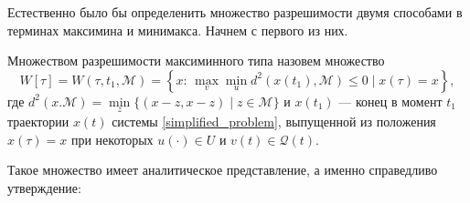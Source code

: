 Естественно было бы определенить множество разрешимости двумя способами в терминах
 максимина и минимакса. Начнем с первого из них.

 \begin{definition}
    Множеством разрешимости максиминного типа назовем множество
    \begin{equation*}
        W[\tau] = W(\tau, t_1, \mathcal{M}) = \left\{ x: \, \max_v \min_u
         d^2(x(t_1), \mathcal{M}) \le 0 \mid x(\tau) = x \right\}, 
    \end{equation*}
     где \( d^2(x. \mathcal{M}) = \min\limits_z \{ (x-z,x-z) \mid z \in 
     \mathcal{M} \} \) и \( x(t_1) \) --- конец в момент \( t_1 \) траектории
     \( x(t) \) системы \eqref{simplified_problem}, выпущенной из положения 
     \( x(\tau) = x \) при некоторых \( u(\cdot) \in U \) и \( v(t) \in 
     \mathcal{Q}(t) \).
\end{definition}

Такое множество имеет аналитическое представление, а именно справедливо
 утверждение:

